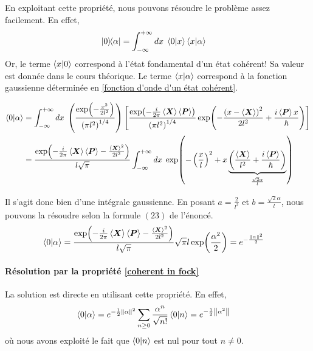 \documentclass[11pt,oneside,a4paper]{article}
\newcommand{\h}{\ensuremath{\hbar}}
\begin{document}
En exploitant cette propriété, nous pouvons résoudre le problème assez facilement. En effet,
\begin{align*}
  \ketbra{0}{\alpha} &= \int_{-\infty}^{+\infty}dx \; \braket{0}{x}\braket{x}{\alpha}
\end{align*}
Or, le terme $\braket{x}{0}$ correspond à l'état fondamental d'un état cohérent! Sa valeur est donnée dans le cours théorique. Le terme $\braket{x}{\alpha}$ correspond à la fonction gaussienne déterminée en \ref{fonction d'onde d'un état cohérent}.

\begin{align*}
  \braket{0}{\alpha} &= \int_{-\infty}^{+\infty}dx \; \left(\frac{\exp(-\frac{x^2}{2l^2})}{\left(\pi l^2\right)^{1/4}}\right)\left[\frac{\exp(-\frac{i}{2\pi}\expval{\bm{X}}\expval{\bm{P}})}{\left(\pi l^2\right)^{1/4}}\exp(-\frac{\left(x-\expval{\bm{X}}\right)^2}{2l^2}+\frac{i\expval{\bm{P}}x}{\hbar})\right]\\
  &= \frac{\exp(-\frac{i}{2\pi}\expval{\bm{X}}\expval{\bm{P}}-\frac{\expval{\bm{X}}^2}{2l^2})}{l\sqrt{\pi}}\int_{-\infty}^{+\infty}dx \; \exp(-\left(\frac{x}{l}\right)^2+x\underbrace{\left(\frac{\expval{\bm{X}}}{l^2}+\frac{i\expval{\bm{P}}}{\h}\right)}_{\frac{\sqrt{2}\alpha}{l}})\\
\end{align*}

Il s'agit donc bien d'une intégrale gaussienne. En posant $a=\frac{2}{l^2}$ et $b=\frac{\sqrt{2}\alpha}{l}$, nous pouvons la résoudre selon la formule $(23)$ de l'énoncé.
\begin{align*}
  \braket{0}{\alpha} &= \frac{\exp(-\frac{i}{2\pi}\expval{\bm{X}}\expval{\bm{P}}-\frac{\expval{\bm{X}}^2}{2l^2})}{l\sqrt{\pi}}\sqrt{\pi}l\exp(\frac{\alpha^2}{2}) = e^{-\frac{\norm{\alpha}^2}{2}}
\end{align*}

\paragraph{Résolution par la propriété \ref{coherent in fock}}

La solution est directe en utilisant cette propriété. En effet,
\begin{align*}
  \braket{0}{\alpha} &= e^{-\frac{1}{2}\norm{\alpha}^2}\sum_{n\geq 0}\frac{\alpha^n}{\sqrt{n!}}\braket{0}{n} = e^{-\frac{1}{2}\norm{\alpha^2}}
\end{align*}
où nous avons exploité le fait que $\braket{0}{n}$ est nul pour tout $n\neq 0$.
\end{document}
